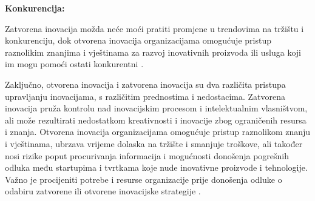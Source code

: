 \textbf{Konkurencija:}

Zatvorena inovacija možda neće moći pratiti promjene u trendovima na tržištu i
konkurenciju, dok otvorena inovacija organizacijama omogućuje pristup raznolikim
znanjima i vještinama za razvoj inovativnih proizvoda ili usluga koji im mogu
pomoći ostati konkurentni \citep{asd4}.

Zaključno, otvorena inovacija i zatvorena inovacija su dva različita pristupa
upravljanju inovacijama, s različitim prednostima i nedostacima. Zatvorena
inovacija pruža kontrolu nad inovacijskim procesom i intelektualnim vlasništvom,
ali može rezultirati nedostatkom kreativnosti i inovacije zbog ograničenih
resursa i znanja. Otvorena inovacija organizacijama omogućuje pristup raznolikom
znanju i vještinama, ubrzava vrijeme dolaska na tržište i smanjuje troškove, ali
također nosi rizike poput procurivanja informacija i mogućnosti donošenja
pogrešnih odluka među startupima i tvrtkama koje nude inovativne proizvode i
tehnologije. Važno je procijeniti potrebe i resurse organizacije prije donošenja
odluke o odabiru zatvorene ili otvorene inovacijske strategije \citep{asd3}.